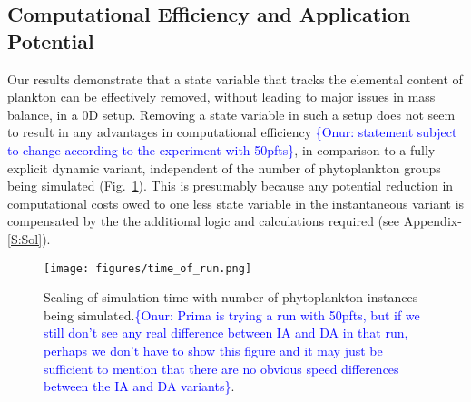 \documentclass[gmd, manuscript]{copernicus}
\newcommand{\onur}[1]{\textcolor{blue}{\{Onur: #1\}}}
\begin{document}
\subsection{Computational Efficiency and Application Potential}
Our results demonstrate that a state variable that tracks the elemental content of plankton can be effectively removed, without leading to major issues in mass balance, in a 0D setup. Removing a state variable in such a setup does not seem to result in any advantages in computational efficiency \onur{statement subject to change according to the experiment with 50pfts}, in comparison to a fully explicit dynamic variant, independent of the number of phytoplankton groups being simulated (Fig.~\ref{f.speed}). This is presumably because any potential reduction in computational costs owed to one less state variable in the instantaneous variant is  compensated by the  the additional logic and calculations required (see Appendix-\ref{S:Sol}).

\begin{figure}[ht!]
\texttt{[image: figures/time\_of\_run.png]}
\caption{Scaling of simulation time with number of phytoplankton instances being simulated.\onur{Prima is trying a run with 50pfts, but if we still don't see any real difference between IA and DA in that run, perhaps we don't have to show this figure and it may just be sufficient to mention that there are no obvious speed differences between the IA and DA variants}.\label{f.speed}}
\end{figure}
\end{document}
